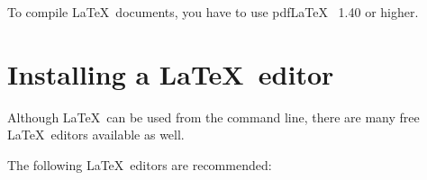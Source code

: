 \documentclass[]{xfel.eu-report}
\begin{document}
\begin{tipbox} To compile \LaTeX\ documents, you have to use pdf\LaTeX\   
1.40 or higher. 
\end{tipbox}

\section{Installing a \LaTeX\ editor}
\label{installing-latex-editor}

Although \LaTeX\ can be used from the command line, there are many free \LaTeX\
editors available as well. 

The following \LaTeX\ editors are recommended:
\end{document}
